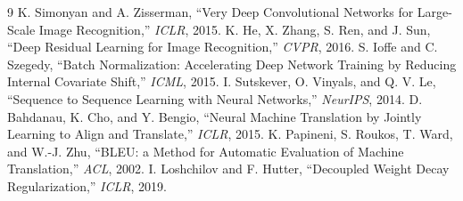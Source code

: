 \documentclass[conference]{IEEEtran}
\begin{document}
\begin{thebibliography}{9}
 K. Simonyan and A. Zisserman, ``Very Deep Convolutional Networks for Large-Scale Image Recognition,'' \emph{ICLR}, 2015.
 K. He, X. Zhang, S. Ren, and J. Sun, ``Deep Residual Learning for Image Recognition,'' \emph{CVPR}, 2016.
 S. Ioffe and C. Szegedy, ``Batch Normalization: Accelerating Deep Network Training by Reducing Internal Covariate Shift,'' \emph{ICML}, 2015.
 I. Sutskever, O. Vinyals, and Q. V. Le, ``Sequence to Sequence Learning with Neural Networks,'' \emph{NeurIPS}, 2014.
 D. Bahdanau, K. Cho, and Y. Bengio, ``Neural Machine Translation by Jointly Learning to Align and Translate,'' \emph{ICLR}, 2015.
 K. Papineni, S. Roukos, T. Ward, and W.-J. Zhu, ``BLEU: a Method for Automatic Evaluation of Machine Translation,'' \emph{ACL}, 2002.
 I. Loshchilov and F. Hutter, ``Decoupled Weight Decay Regularization,'' \emph{ICLR}, 2019.
\end{thebibliography}
\end{document}
